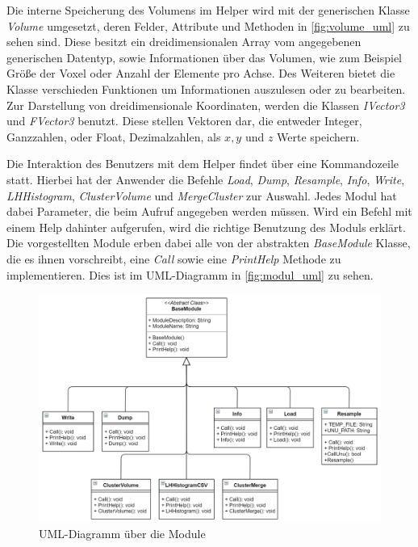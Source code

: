 Die interne Speicherung des Volumens im Helper wird mit der generischen Klasse \textit{Volume} umgesetzt, deren Felder, Attribute und Methoden in \autoref{fig:volume_uml} zu sehen sind. Diese besitzt ein dreidimensionalen Array vom angegebenen generischen Datentyp, sowie Informationen über das Volumen, wie zum Beispiel Größe der Voxel oder Anzahl der Elemente pro Achse.
Des Weiteren bietet die Klasse verschieden Funktionen um Informationen auszulesen oder zu bearbeiten. Zur Darstellung von dreidimensionale Koordinaten, werden die Klassen \textit{IVector3} und \textit{FVector3} benutzt. Diese stellen Vektoren dar, die entweder Integer, Ganzzahlen, oder Float, Dezimalzahlen, als $x,y$ und $z$ Werte speichern.


Die Interaktion des Benutzers mit dem Helper findet über eine Kommandozeile statt. Hierbei hat der Anwender die Befehle \textit{Load}, \textit{Dump}, \textit{Resample}, \textit{Info}, \textit{Write}, \textit{LHHistogram}, \textit{ClusterVolume} und \textit{MergeCluster} zur Auswahl. Jedes Modul hat dabei Parameter, die beim Aufruf angegeben werden müssen. Wird ein Befehl mit einem Help dahinter aufgerufen, wird die richtige Benutzung des Moduls erklärt.
Die vorgestellten Module erben dabei alle von der abstrakten \textit{BaseModule} Klasse, die es ihnen vorschreibt, eine \textit{Call} sowie eine \textit{PrintHelp} Methode zu implementieren. Dies ist im UML-Diagramm in \autoref{fig:modul_uml} zu sehen.


\begin{figure}
\centering 
\includegraphics[width=\textwidth]{Logos/Modules_UML.PNG}
\caption{UML-Diagramm über die Module} 
\label{fig:modul_uml} 
\end{figure}


